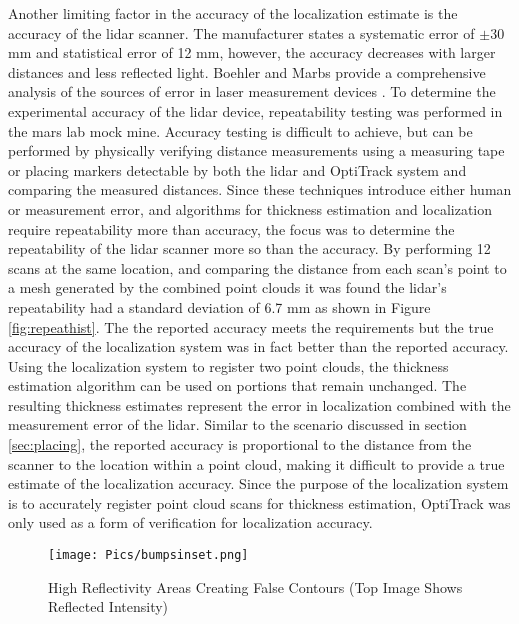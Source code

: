 Another limiting factor in the accuracy of the localization estimate is the accuracy of the \acrshort{lidar} scanner. The manufacturer states a systematic error of $\pm$30 mm and statistical error of 12 mm, however, the accuracy decreases with larger distances and less reflected light. Boehler and Marbs provide a comprehensive analysis of the sources of error in laser measurement devices \cite{checkthebookmarksbar}. To determine the experimental accuracy of the \acrshort{lidar} device, repeatability testing was performed in the \acrshort{mars} lab mock mine. Accuracy testing is difficult to achieve, but can be performed by physically verifying distance measurements using a measuring tape or placing markers detectable by both the \acrshort{lidar} and OptiTrack system and comparing the measured distances. Since these techniques introduce either human or measurement error, and algorithms for thickness estimation and localization require repeatability more than accuracy, the focus was to determine the repeatability of the \acrshort{lidar} scanner more so than the accuracy. By performing 12 scans at the same location, and comparing the distance from each scan's point to a mesh generated by the combined point clouds it was found the \acrshort{lidar}'s repeatability had a standard deviation of 6.7 mm as shown in Figure \ref{fig:repeathist}. The the reported accuracy meets the requirements but the true accuracy of the localization system was in fact better than the reported accuracy. Using the localization system to register two point clouds, the thickness estimation algorithm can be used on portions that remain unchanged. The resulting thickness estimates represent the error in localization combined with the measurement error of the \acrshort{lidar}. Similar to the scenario discussed in section \ref{sec:placing}, the reported accuracy is proportional to the distance from the scanner to the location within a point cloud, making it difficult to provide a true estimate of the localization accuracy. Since the purpose of the localization system is to accurately register point cloud scans for thickness estimation, OptiTrack was only used as a form of verification for localization accuracy.\\

\begin{figure}
    \centering
    \texttt{[image: Pics/bumpsinset.png]}
    \caption{High Reflectivity Areas Creating False Contours (Top Image Shows Reflected Intensity)}
    \label{fig:bumps}
\end{figure}


